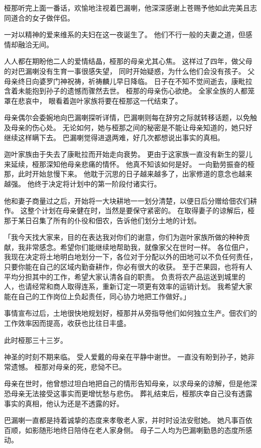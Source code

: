 \documentclass[twoside,openany]{book}
\begin{document}
桠那听完上面一番话，欢愉地注视着巴漏喇，他深深感谢上苍赐予他如此完美且志同道合的女子做伴侣。

一对以精神的爱来维系的夫妇在这一夜诞生了。
他们不行一般的夫妻之道，但感情却融洽无间。

人人都在期盼他二人的爱情结晶，桠那的母亲尤其心焦。
这样过了四年，做父母的对巴漏喇没有生育一事很感失望，
 同时开始疑惑，为什么他们会没有孩子。
父母亲终日向婆罗门神祝祷，祈祷麟儿早日降临。
日子在不知不觉间逝去，康毗拉含着未能抱到孙子的遗憾而骤然去世。
桠那的母亲伤心欲绝。
全家全族的人都笼罩在悲哀中，
眼看着迦叶家族将要在桠那这一代结束了。

母亲偶尔会委婉地向巴漏喇探听详情，巴漏喇则每在辞穷之际就转移话题，以免触及母亲的伤心处。
无论如何，她与桠那之间的秘密是不能让母亲知道的，她只好继续这样瞒下去。
巴漏喇觉得进退两难，好几次都想说出事实的真相。

迦叶家族由于失去了康毗拉而开始走向衰势。
更由于这家族一直没有新生的婴儿来延续，桠那深知他母亲悲痛的情怀。
他真不知该如何是好。
一向勤劳振奋的桠那，此时开始怠慢下来。
他耽于沉思的日子越来越多了，出家修道的意念也越来越强。
他终于决定将计划中的第一阶段付诸实行。

他和妻子商量过之后，开始将一大块耕地一一划分清楚，以便日后分赠给佃农们耕作。
这整个计划在母亲健在时，当然是要保守紧密的。
在取得妻子的谅解后，桠那于某日召集了所有的仆役和佃农，告诉他们划分土地的计划。

「我今天找大家来，目的在表达我对你们的谢意，你们为迦叶家族所做的种种贡献，我非常感念。希望你们能继续地帮助我，就像家父在世时一样。
各位佃户，我现在决定将土地明白地划分一下，各位对于分配以外的田地可以不负任何责任，只要你能在自己的区域内勤奋耕作，你必有很大的收获。
至于芒果园，也将有人平均分担其中的工作，希望大家认清各自的职责。
负责将农产品运送到城里的人，也请经常和商人取得连系，重新订定一项更有效率的运销计划。
我希望大家能在自己的工作岗位上负起责任，同心协力地把工作做好。」

事情宣布过后，土地很快地规划好，桠那并从旁指导他们如何独立生产。佃农们的工作效率因而提高，收获也比往日丰盛。

此时桠那三十三岁。

神圣的时刻不期来临。
受人爱戴的母亲在平静中谢世。
一直没有盼到孙子，她非常遗憾。
桠那对母亲的死，悲恸不已。

母亲在世时，他曾想过坦白地把自己的情形告知母亲，以求母亲的谅解，但是他深恐母亲无法接受这事实而更增忧愁与悲伤。
葬礼结束后，桠那庆幸自己没有透露事实的真相，他认为还是不透露的好。

巴漏喇一直都是持着诚挚的态度来孝敬老人家，并时时设法安慰她。
她凡事百依百顺，如影随形地终日陪侍在老人家身侧。
母子二人均为巴漏喇勤恳的态度所感动。
\end{document}
